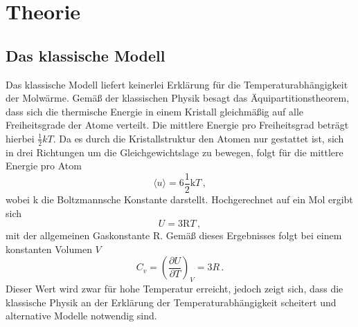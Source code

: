 \section{Theorie}
\subsection{Das klassische Modell}
Das klassische Modell liefert keinerlei Erklärung für die Temperaturabhängigkeit der Molwärme. Gemäß der klassischen Physik besagt das Äquipartitionstheorem, dass
sich die thermische Energie in einem Kristall gleichmäßig auf alle Freiheitsgrade der Atome verteilt. Die mittlere Energie pro Freiheitsgrad beträgt hierbei $\frac{1}{2}kT$. Da
es durch die Kristallstruktur den Atomen nur gestattet ist, sich in drei Richtungen um die Gleichgewichtslage zu bewegen, folgt für die mittlere Energie pro Atom
\begin{equation}
  \langle u \rangle = 6 \frac{1}{2}\text{k}T\, ,
\end{equation}
wobei k die Boltzmannsche Konstante darstellt. Hochgerechnet auf ein Mol ergibt sich
\begin{equation}
  U = 3 \text{R}T \, ,
\end{equation}
mit der allgemeinen Gaskonstante R. Gemäß dieses Ergebnisses folgt bei einem konstanten Volumen $V$
\begin{equation}
  C_v= \left(\frac{\partial U}{\partial T}\right)_V=3R\, .
\end{equation}
Dieser Wert wird zwar für hohe Temperatur erreicht, jedoch zeigt sich, dass die klassische Physik an der Erklärung der Temperaturabhängigkeit scheitert
und alternative Modelle notwendig sind.
